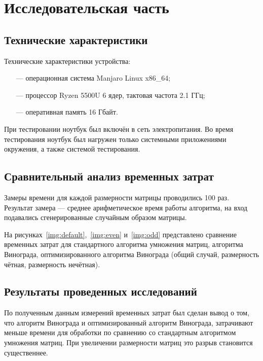 \chapter{Исследовательская часть}

\section{Технические характеристики}

Технические характеристики устройства:

\begin{itemize}
	\item[---] операционная система Manjaro Linux x86\_64;
	\item[---] процессор Ryzen 5500U 6 ядер, тактовая частота 2.1 ГГц;
	\item[---] оперативная память 16 Гбайт.
\end{itemize}

При тестировании ноутбук был включён в сеть электропитания. Во время тестирования ноутбук был нагружен только системными приложениями окружения, а также системой тестирования.

\section{Сравнительный анализ временных затрат}

Замеры времени для каждой размерности матрицы проводились 100 раз. Результат замера --- среднее арифметическое время работы алгоритма, на вход подавались сгенерированные случайным образом матрицы.

На рисунках~\ref{img:default},~\ref{img:even} и~\ref{img:odd} представлено сравнение временных затрат для стандартного алгоритма умножения матриц, алгоритма Винограда, оптимизированного алгоритма Винограда (общий случай, размерность чётная, размерность нечётная).

\FloatBarrier
{}
\FloatBarrier

\section{Результаты проведенных исследований}

По полученным данным измерений временных затрат был сделан вывод о том, что алгоритм Винограда и оптимизированный алгоритм Винограда, затрачивают меньше времени для обработки по сравнению со стандартным алгоритмом умножения матриц. При увеличении размерности матриц это разрыв становится существеннее.

\clearpage
